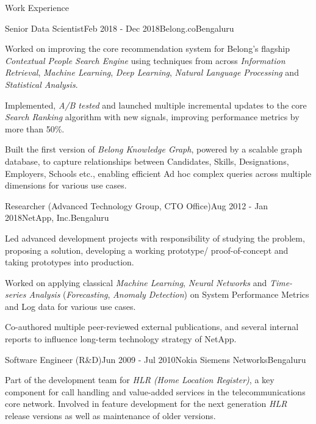 \documentclass{resume} %
\begin{document}
\begin{rSection}{Work Experience}
\begin{rSubsection}{Senior Data Scientist}{Feb 2018 - Dec 2018}{Belong.co}{Bengaluru}
\item Worked on improving the core recommendation system for Belong's flagship {\em Contextual People Search Engine} using techniques from across {\em Information Retrieval}, {\em Machine Learning}, {\em Deep Learning}, {\em Natural Language Processing} and {\em Statistical Analysis}.
\item Implemented, {\em A/B tested} and launched multiple incremental updates to the core {\em Search Ranking} algorithm with new signals, improving performance metrics by more than 50\%.  
\item Built the first version of {\em Belong Knowledge Graph}, powered by a scalable graph database, to capture relationships between Candidates, Skills,  Designations, Employers, Schools etc., enabling efficient Ad hoc complex queries across multiple dimensions for various use cases.

\end{rSubsection}

\begin{rSubsection}{Researcher (Advanced Technology Group, CTO Office)}{Aug 2012 - Jan 2018}{NetApp, Inc.}{Bengaluru}
\item Led advanced development projects with responsibility of studying the problem, proposing a solution, developing a working prototype/ proof-of-concept and taking prototypes into production.
\item Worked on applying classical {\em Machine Learning}, {\em Neural Networks} and {\em Time-series Analysis} ({\em Forecasting}, {\em Anomaly Detection}) on System Performance Metrics and Log data for various use cases.
\item Co-authored multiple peer-reviewed external publications, and several internal reports to influence long-term technology strategy of NetApp. 
\end{rSubsection}

\begin{rSubsection}{Software Engineer (R\&D)}{Jun 2009 - Jul 2010}{Nokia Siemens Networks}{Bengaluru}
\item Part of the development team for {\em HLR (Home Location Register)}, a key component for call handling and value-added services in the telecommunications core network. Involved in feature development for the next generation {\em HLR} release versions as well as maintenance of older versions.

\end{rSubsection}

\end{rSection}
\end{document}
